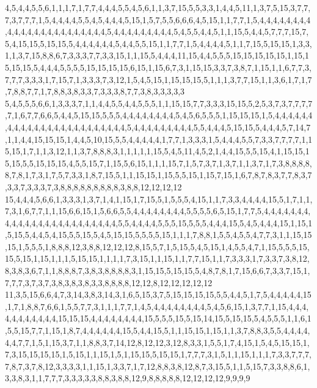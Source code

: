 4,5,4,4,5,5,6,1,1,1,7,1,7,7,4,4,4,5,5,4,5,6,1,1,3,7,15,5,5,3,3,1,4,4,5,11,1,3,7,5,15,3,7,7,7,3,7,7,7,1,5,4,4,4,4,5,5,4,5,4,4,4,5,15,1,5,7,5,5,6,6,6,4,5,15,1,1,7,7,1,5,4,4,4,4,4,4,4,4,4,4,4,4,4,4,4,4,4,4,4,4,4,4,4,5,4,4,4,4,4,4,4,4,4,5,4,5,5,4,4,5,1,1,15,5,4,4,5,7,7,7,15,7,5,4,15,15,5,15,15,5,4,4,4,4,4,4,5,4,4,5,5,15,1,1,7,7,1,5,4,4,4,4,5,1,1,7,15,5,15,15,1,3,3,1,1,3,7,15,8,8,6,7,3,3,3,7,7,3,3,15,1,1,15,5,4,4,4,11,15,4,4,5,5,5,15,15,15,15,15,1,15,15,15,15,5,4,4,4,5,5,5,5,15,15,15,15,6,15,1,15,6,7,3,1,15,15,3,3,7,3,8,7,1,15,1,1,6,7,7,3,7,7,7,3,3,3,1,7,15,7,1,3,3,3,7,3,12,1,5,4,5,15,1,15,15,15,5,1,1,1,3,7,7,15,1,1,3,6,1,7,1,7,7,8,8,7,7,1,7,8,8,3,8,3,3,7,3,3,3,8,7,7,3,8,3,3,3,3,3
5,4,5,5,5,6,6,1,3,3,3,7,1,1,4,4,5,5,4,4,5,5,5,1,1,15,15,7,7,3,3,3,15,15,5,2,5,3,7,3,7,7,7,7,7,1,6,7,7,6,6,5,4,4,5,15,15,5,5,5,4,4,4,4,4,4,4,4,5,4,5,6,5,5,5,1,15,15,15,1,5,4,4,4,4,4,4,4,4,4,4,4,4,4,4,4,4,4,4,4,4,4,4,4,4,5,4,4,4,4,4,4,4,4,4,5,5,4,4,4,5,15,15,5,4,4,4,5,7,14,7,1,1,4,4,15,15,15,1,4,4,5,10,15,5,5,4,4,4,4,4,1,7,7,1,3,3,3,1,5,4,4,4,5,5,7,3,3,7,7,7,7,1,15,15,1,7,1,1,3,12,1,1,3,7,8,8,8,3,1,1,1,1,1,15,5,4,5,11,4,5,2,1,4,4,15,5,5,15,4,1,15,15,15,15,5,5,15,15,15,4,5,5,15,7,1,15,5,6,15,1,1,1,15,7,1,5,7,3,7,1,3,7,1,1,3,7,1,7,3,8,8,8,8,8,7,8,1,7,3,1,7,5,7,3,3,1,8,7,15,5,1,1,15,15,1,15,5,5,15,1,15,7,15,1,6,7,8,7,8,3,7,7,8,3,7,3,3,7,3,3,3,7,3,8,8,8,8,8,8,8,8,8,3,8,8,12,12,12,12
15,4,4,4,5,6,6,1,3,3,3,1,3,7,1,4,1,15,1,7,15,5,1,5,5,5,4,15,1,1,7,3,3,4,4,4,4,15,5,1,7,1,1,7,3,1,6,7,7,1,1,15,6,6,15,1,5,6,6,5,5,4,4,4,4,4,4,4,4,5,5,5,5,6,5,15,1,7,7,5,4,4,4,4,4,4,4,4,4,4,4,4,4,4,4,4,4,4,4,4,4,4,4,4,5,5,4,4,4,4,5,5,5,15,5,5,5,4,4,4,15,5,4,5,4,4,4,15,1,15,1,5,15,5,4,4,5,4,15,5,5,15,5,4,5,15,15,5,5,5,5,15,1,1,1,7,8,8,1,5,5,4,5,5,4,7,7,3,1,1,15,15,15,1,5,5,5,1,8,8,8,12,3,8,8,12,12,12,8,15,5,7,1,5,15,5,4,5,15,1,4,5,5,4,7,1,15,5,5,5,15,15,5,15,1,15,1,1,1,5,15,15,1,1,1,1,7,3,15,1,1,15,1,1,7,7,15,1,1,7,3,3,3,1,7,3,3,7,3,8,12,8,3,8,3,6,7,1,1,8,8,8,7,3,8,3,8,8,8,8,3,1,15,15,5,15,15,5,4,8,7,8,1,7,15,6,6,7,3,3,7,15,1,7,7,7,3,7,3,7,3,8,3,8,3,8,3,3,8,8,8,8,12,12,8,12,12,12,12,12
11,3,5,15,6,6,4,7,3,14,3,8,3,14,3,1,6,5,15,3,7,5,15,15,15,15,5,5,4,4,5,1,7,5,4,4,4,4,4,15,1,7,1,8,8,7,6,6,1,5,5,7,7,3,1,1,1,7,7,1,4,5,4,4,4,4,4,4,4,4,5,4,5,6,15,1,3,7,7,1,15,4,4,4,4,4,4,4,4,4,4,4,15,15,15,4,4,4,4,4,4,4,4,15,5,5,5,15,5,15,14,15,5,15,15,5,4,5,5,5,1,1,6,1,5,5,15,7,7,1,15,1,8,7,4,4,4,4,4,4,15,5,4,4,15,5,1,1,15,15,1,15,1,1,3,7,8,8,3,5,5,4,4,4,4,4,4,7,7,1,5,1,15,3,7,1,1,8,8,3,7,14,12,8,12,12,3,12,8,3,3,1,5,5,1,7,4,15,1,5,4,5,15,15,1,7,3,15,15,15,15,1,5,15,1,1,15,1,5,1,15,15,5,15,15,1,7,7,7,3,1,5,1,1,15,1,1,1,7,3,3,7,7,7,7,8,7,3,7,8,12,3,3,3,3,1,1,15,1,3,3,7,1,7,12,8,8,3,8,12,8,7,3,15,5,1,1,5,15,7,3,3,8,8,6,1,3,3,8,3,1,1,7,7,7,3,3,3,3,3,8,8,3,8,8,12,9,8,8,8,8,8,12,12,12,12,9,9,9,9
